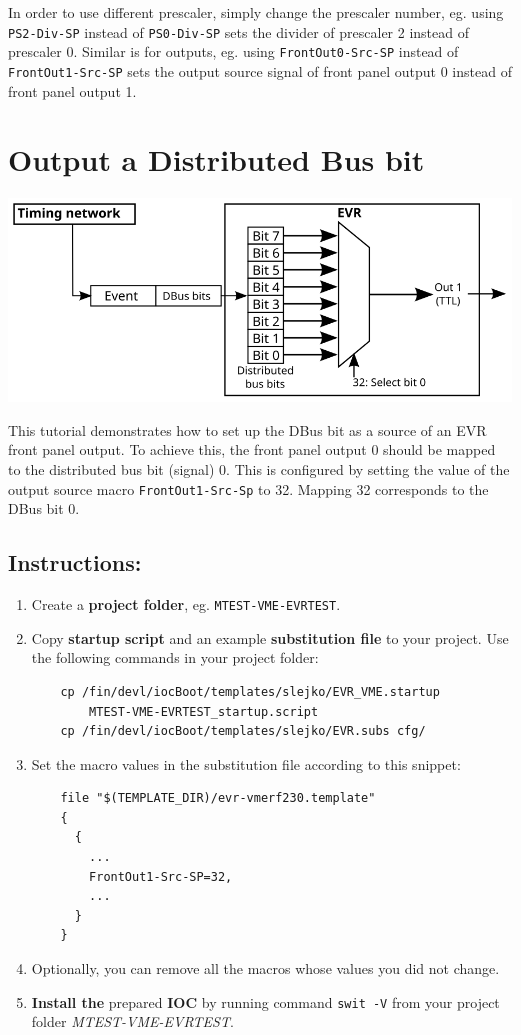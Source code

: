 \documentclass[12pt,a4paper]{article}
\begin{document}
In order to use different prescaler, simply change the prescaler number, eg. using \texttt{PS2-Div-SP} instead of \texttt{PS0-Div-SP} sets the divider of prescaler 2 instead of prescaler 0.
Similar is for outputs, eg. using \texttt{FrontOut0-Src-SP} instead of \texttt{FrontOut1-Src-SP} sets the output source signal of front panel output 0 instead of front panel output 1.

\section{Output a Distributed Bus bit}
	\includegraphics[]{./img/dbus}
	
This tutorial demonstrates how to set up the DBus bit as a source of an EVR front panel output. To achieve this, the front panel output 0 should be mapped to the distributed bus bit (signal) 0. This is configured by setting the value of the output source macro \texttt{FrontOut1-Src-Sp} to 32. Mapping 32 corresponds to the DBus bit 0.

\subsection{Instructions:}
\begin{enumerate}
	\item Create a \textbf{project folder}, eg. \texttt{MTEST-VME-EVRTEST}.
	\item Copy \textbf{startup script} and an example \textbf{substitution file} to your project. Use the following commands in your project folder:
\begin{verbatim}
	cp /fin/devl/iocBoot/templates/slejko/EVR_VME.startup 
	    MTEST-VME-EVRTEST_startup.script
	cp /fin/devl/iocBoot/templates/slejko/EVR.subs cfg/
\end{verbatim}

	\item Set the macro values in the substitution file according to this snippet:
\begin{verbatim}
	file "$(TEMPLATE_DIR)/evr-vmerf230.template"
	{
	  {
	    ...
	    FrontOut1-Src-SP=32,
	    ...
	  }
	}
\end{verbatim}

	\item Optionally, you can remove all the macros whose values you did not change. 
	\item \textbf{Install the} prepared \textbf{IOC} by running command \texttt{swit -V} from your project folder \textit{MTEST-VME-EVRTEST}.
\end{enumerate}
\end{document}
